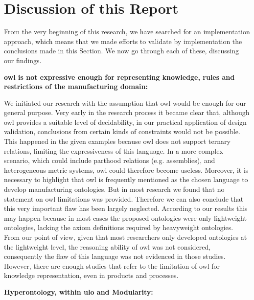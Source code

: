 \section{Discussion of this Report}

From the very beginning of this research, we have searched for an implementation approach, which means that we made efforts to validate by implementation the conclusions made in this Section. We now go through each of these, discussing our findings.

\noindent \textbf{\gls{owl} is not expressive enough for representing knowledge, rules and restrictions of the manufacturing domain:} 

We initiated our research with the assumption that \gls{owl} would be enough for our general purpose. Very early in the research process it became clear that, although \gls{owl} provides a suitable level of decidability, in our practical application of design validation, conclusions from certain kinds of constraints would not be possible. This happened in the given examples because \gls{owl} does not support ternary relations, limiting the expressiveness of this language. In a more complex scenario, which could include parthood relations (e.g. assemblies), and heterogeneous metric systems, \gls{owl} could therefore become useless. Moreover, it is necessary to highlight that \gls{owl} is frequently mentioned as the chosen language to develop manufacturing ontologies. But in most research we found that no statement on \gls{owl} limitations was provided. Therefore we can also conclude that this very important flaw has been largely neglected. According to our results this may happen because in most cases the proposed ontologies were only lightweight ontologies, lacking the axiom definitions required by heavyweight ontologies.  From our point of view, given that most researchers only developed ontologies at the lightweight level, the reasoning ability of \gls{owl} was not considered, consequently the flaw of this language was not evidenced in those studies. However, there are enough studies that refer to the limitation of \gls{owl} for knowledge representation, even in products and processes.

\noindent \textbf{Hyperontology, within \gls{ulo} and Modularity:} 

